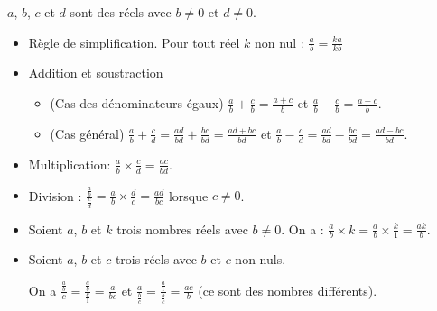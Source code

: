     \begin{prp}[name={Opérations sur les fractions}]
    $a$, $b$, $c$ et $d$ sont des réels avec $b\neq0$ et $d\neq0$.
    \begin{itemize}
    \item Règle de simplification. Pour tout réel $k$ non nul : \hfill $\frac{a}{b}=\frac{ka}{kb}$ \hfill~
    \item Addition et soustraction
        \begin{itemize}
        \item (Cas des dénominateurs égaux) \hfill 
         $\frac{a}{b}+\frac{c}{b}=\frac{a+c}{b}$ et $\frac{a}{b}-\frac{c}{b}=\frac{a-c}{b}$.
         \hfill~
        \item (Cas général) \hfill
        $\frac{a}{b}+\frac{c}{d}=\frac{ad}{bd}+\frac{bc}{bd}=\frac{ad+bc}{bd}$ \quad et \quad        
        $\frac{a}{b}-\frac{c}{d}=\frac{ad}{bd}-\frac{bc}{bd}=\frac{ad-bc}{bd}$.\hfill~
        \end{itemize}
    \item Multiplication: \hfill $\frac{a}{b}\times\frac{c}{d}=\frac{ac}{bd}$.    \hfill~
    \item Division : \hfill 
        $\frac{\frac{a}{b}}{\frac{c}{d}}=\frac{a}{b}\times\frac{d}{c}=\frac{ad}{bc}$ lorsque $c\neq0$.\hfill~
\end{itemize}
    \end{prp}
%
    \begin{rmq}
        \begin{itemize}
        \item Soient $a$, $b$ et $k$ trois nombres réels avec $b\neq0$. On a :        
        $\frac{a}{b}\times k= \frac{a}{b}\times \frac{k}{1} = \frac{ak}{b}$.
        \item    Soient $a$, $b$ et $c$ trois réels avec $b$ et $c$ non nuls.

\vspace*{3pt}   On a $\frac{\frac{a}{b}}{c}=\frac{\frac{a}{b}}{\frac{c}{1}}=\frac{a}{bc}$ et $\frac{a}{\frac{b}{c}}=\frac{\frac{a}{1}}{\frac{b}{c}}=\frac{ac}{b}$ (ce sont des nombres différents).    
        \end{itemize}
   \end{rmq} 
%
%
%
